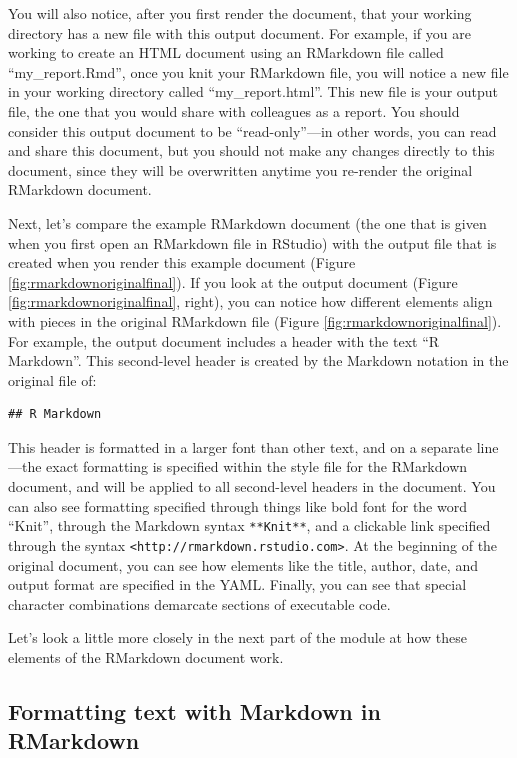 \documentclass[]{tufte-book}
\begin{document}
You will also notice, after you first render the document, that your working
directory has a new file with this output document. For example, if you are
working to create an HTML document using an RMarkdown file called
``my\_report.Rmd'', once you knit your RMarkdown file, you will notice a new file
in your working directory called ``my\_report.html''. This new file is your output
file, the one that you would share with colleagues as a report. You should
consider this output document to be ``read-only''---in other words, you can read and
share this document, but you should not make any changes directly to this
document, since they will be overwritten anytime you re-render the original
RMarkdown document.

Next, let's compare the example RMarkdown document (the one that is given when
you first open an RMarkdown file in RStudio) with the output file that is
created when you render this example document (Figure
\ref{fig:rmarkdownoriginalfinal}). If you look at the output document (Figure
\ref{fig:rmarkdownoriginalfinal}, right), you can notice how different elements
align with pieces in the original RMarkdown file (Figure
\ref{fig:rmarkdownoriginalfinal}). For example, the output document includes a
header with the text ``R Markdown''. This second-level header is created by the
Markdown notation in the original file of:

\begin{verbatim}
## R Markdown
\end{verbatim}

This header is formatted in a larger font than other text, and on a separate
line---the exact formatting is specified within the style file for the RMarkdown
document, and will be applied to all second-level headers in the document. You
can also see formatting specified through things like bold font for the word
``Knit'', through the Markdown syntax \texttt{**Knit**}, and a clickable link specified
through the syntax \texttt{\textless{}http://rmarkdown.rstudio.com\textgreater{}}. At the beginning of the
original document, you can see how elements like the title, author, date, and
output format are specified in the YAML. Finally, you can see that special
character combinations demarcate sections of executable code.

Let's look a little more closely in the next part of the module at how these
elements of the RMarkdown document work.

\subsection{Formatting text with Markdown in RMarkdown}\label{formatting-text-with-markdown-in-rmarkdown}
\end{document}
